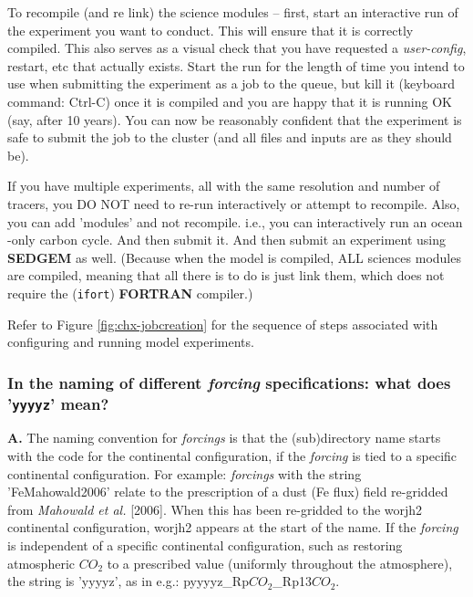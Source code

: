 \documentclass[11pt,fleqn]{book} %
\begin{document}
To  recompile (and re link) the science modules -- first, start an interactive run of the experiment you want to conduct. This will ensure that it is correctly compiled. This also serves as a visual check that you have requested a \textit{user-config}, restart, etc that actually exists. Start the run for the length of time you intend to use when submitting the experiment as a job to the queue, but kill it (keyboard command: \textsf{\footnotesize Ctrl-C}) once it is compiled and you are happy that it is running OK (say, after 10 years).
\noindent You can now be reasonably confident that the experiment is safe to submit the job to the cluster (and all files and inputs are as they should be).

If you have multiple experiments, all with the same resolution and number of tracers, you DO NOT need to re-run interactively or attempt to recompile. Also, you can add 'modules' and not recompile. i.e., you can interactively run an ocean -only carbon cycle. And then submit it. And then submit an experiment using \textbf{SEDGEM} as well. (Because when the model is compiled, ALL sciences modules are compiled, meaning that all there is to do is just link them, which does not require the (\texttt{ifort}) \textbf{FORTRAN} compiler.)

Refer to Figure \ref{fig:chx-jobcreation} for the sequence of steps associated with configuring and running model experiments.

%
\subsubsection{In the naming of different \textit{forcing} specifications: what does '\texttt{yyyyz}' mean?}

\textbf{A.} The naming convention for \textit{forcings} is that the (sub)directory name starts with the code for the continental configuration, if the \textit{forcing} is tied to a specific continental configuration. For example: \textit{forcings} with the string '\textsf{\footnotesize FeMahowald2006}' relate to the prescription of a dust (Fe flux) field re-gridded from \textit{Mahowald et al.} [2006]. When this has been re-gridded to the \textsf{\footnotesize worjh2} continental configuration, \textsf{\footnotesize worjh2} appears at the start of the name. If the \textit{forcing} is independent of a specific continental configuration, such as restoring atmospheric \(CO_{2}\) to a prescribed value (uniformly throughout the atmosphere), the string is '\textsf{\footnotesize yyyyz}', as in e.g.: \textsf{\footnotesize pyyyyz\_Rp\(CO_{2}\)\_Rp13\(CO_{2}\)}.
\end{document}
